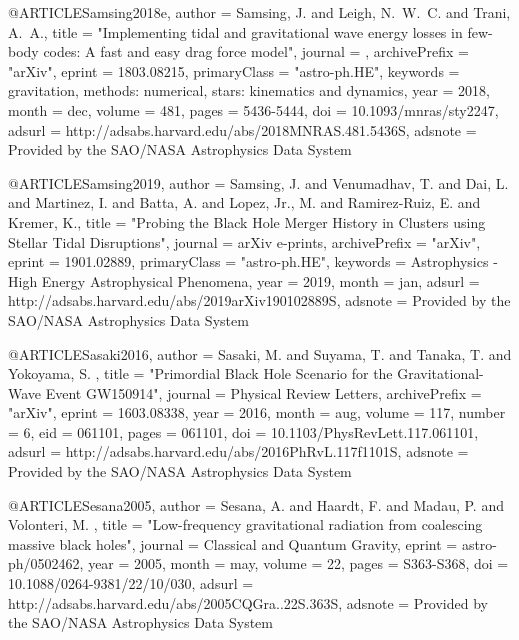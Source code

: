 \documentclass[twocolumn,tighten]{aastex63}
\begin{document}
{{{{{{@ARTICLE{Samsing2018e,
   author = {{Samsing}, J. and {Leigh}, N.~W.~C. and {Trani}, A.~A.},
    title = "{Implementing tidal and gravitational wave energy losses in few-body codes: A fast and easy drag force model}",
  journal = {\mnras},
archivePrefix = "arXiv",
   eprint = {1803.08215},
 primaryClass = "astro-ph.HE",
 keywords = {gravitation, methods: numerical, stars: kinematics and dynamics},
     year = 2018,
    month = dec,
   volume = 481,
    pages = {5436-5444},
      doi = {10.1093/mnras/sty2247},
   adsurl = {http://adsabs.harvard.edu/abs/2018MNRAS.481.5436S},
  adsnote = {Provided by the SAO/NASA Astrophysics Data System}
}

@ARTICLE{Samsing2019,
   author = {{Samsing}, J. and {Venumadhav}, T. and {Dai}, L. and {Martinez}, I. and 
	{Batta}, A. and {Lopez}, Jr., M. and {Ramirez-Ruiz}, E. and 
	{Kremer}, K.},
    title = "{Probing the Black Hole Merger History in Clusters using Stellar Tidal Disruptions}",
  journal = {arXiv e-prints},
archivePrefix = "arXiv",
   eprint = {1901.02889},
 primaryClass = "astro-ph.HE",
 keywords = {Astrophysics - High Energy Astrophysical Phenomena},
     year = 2019,
    month = jan,
   adsurl = {http://adsabs.harvard.edu/abs/2019arXiv190102889S},
  adsnote = {Provided by the SAO/NASA Astrophysics Data System}
}

 

@ARTICLE{Sasaki2016,
   author = {{Sasaki}, M. and {Suyama}, T. and {Tanaka}, T. and {Yokoyama}, S.
	},
    title = "{Primordial Black Hole Scenario for the Gravitational-Wave Event GW150914}",
  journal = {Physical Review Letters},
archivePrefix = "arXiv",
   eprint = {1603.08338},
     year = 2016,
    month = aug,
   volume = 117,
   number = 6,
      eid = {061101},
    pages = {061101},
      doi = {10.1103/PhysRevLett.117.061101},
   adsurl = {http://adsabs.harvard.edu/abs/2016PhRvL.117f1101S},
  adsnote = {Provided by the SAO/NASA Astrophysics Data System}
}


@ARTICLE{Sesana2005,
   author = {{Sesana}, A. and {Haardt}, F. and {Madau}, P. and {Volonteri}, M.
	},
    title = "{Low-frequency gravitational radiation from coalescing massive black holes}",
  journal = {Classical and Quantum Gravity},
   eprint = {astro-ph/0502462},
     year = 2005,
    month = may,
   volume = 22,
    pages = {S363-S368},
      doi = {10.1088/0264-9381/22/10/030},
   adsurl = {http://adsabs.harvard.edu/abs/2005CQGra..22S.363S},
  adsnote = {Provided by the SAO/NASA Astrophysics Data System}
}

}}}}}}
\end{document}

